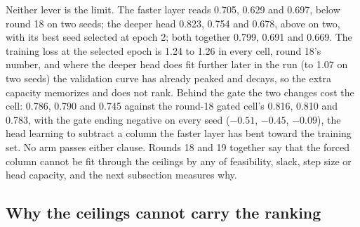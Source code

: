 


Neither lever is the limit. The faster layer reads 0.705, 0.629 and 0.697, below round
18 on two seeds; the deeper head 0.823, 0.754 and 0.678, above on two, with its best
seed selected at epoch 2; both together 0.799, 0.691 and 0.669. The training loss at
the selected epoch is 1.24 to 1.26 in every cell, round 18's number, and where the
deeper head does fit further later in the run (to 1.07 on two seeds) the validation
curve has already peaked and decays, so the extra capacity memorizes and does not
rank. Behind the gate the two changes cost the cell: 0.786, 0.790 and 0.745 against
the round-18 gated cell's 0.816, 0.810 and 0.783, with the gate ending negative on
every seed ($-0.51$, $-0.45$, $-0.09$), the head learning to subtract a column the
faster layer has bent toward the training set. No arm passes either clause. Rounds 18
and 19 together say that the forced column cannot be fit through the ceilings by any
of feasibility, slack, step size or head capacity, and the next subsection measures
why.

\subsection{Why the ceilings cannot carry the ranking}
\label{sec:dual-overlap}

